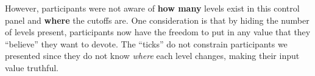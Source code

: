 However, participants were not aware of \textbf{how many} levels exist in this control panel and \textbf{where} the cutoffs are. One consideration is that by hiding the number of levels present, participants now have the freedom to put in any value that they ``believe'' they want to devote. The ``ticks'' do not constrain participants we presented since they do not know \textit{where} each level changes, making their input value truthful.

    
    
    
    


